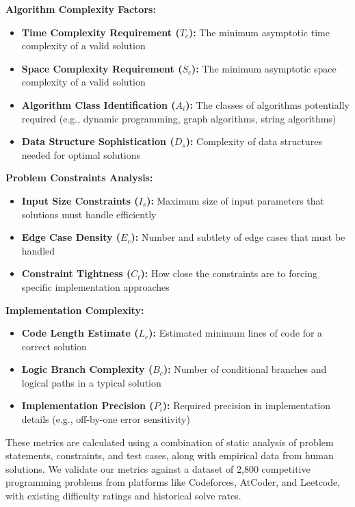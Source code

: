 \textbf{Algorithm Complexity Factors:}
\begin{itemize}
    \item \textbf{Time Complexity Requirement ($T_c$):} The minimum asymptotic time complexity of a valid solution
    \item \textbf{Space Complexity Requirement ($S_c$):} The minimum asymptotic space complexity of a valid solution
    \item \textbf{Algorithm Class Identification ($A_i$):} The classes of algorithms potentially required (e.g., dynamic programming, graph algorithms, string algorithms)
    \item \textbf{Data Structure Sophistication ($D_s$):} Complexity of data structures needed for optimal solutions
\end{itemize}

\textbf{Problem Constraints Analysis:}
\begin{itemize}
    \item \textbf{Input Size Constraints ($I_s$):} Maximum size of input parameters that solutions must handle efficiently
    \item \textbf{Edge Case Density ($E_c$):} Number and subtlety of edge cases that must be handled
    \item \textbf{Constraint Tightness ($C_t$):} How close the constraints are to forcing specific implementation approaches
\end{itemize}

\textbf{Implementation Complexity:}
\begin{itemize}
    \item \textbf{Code Length Estimate ($L_e$):} Estimated minimum lines of code for a correct solution
    \item \textbf{Logic Branch Complexity ($B_c$):} Number of conditional branches and logical paths in a typical solution
    \item \textbf{Implementation Precision ($P_i$):} Required precision in implementation details (e.g., off-by-one error sensitivity)
\end{itemize}

These metrics are calculated using a combination of static analysis of problem statements, constraints, and test cases, along with empirical data from human solutions. We validate our metrics against a dataset of 2,800 competitive programming problems from platforms like Codeforces, AtCoder, and Leetcode, with existing difficulty ratings and historical solve rates.

